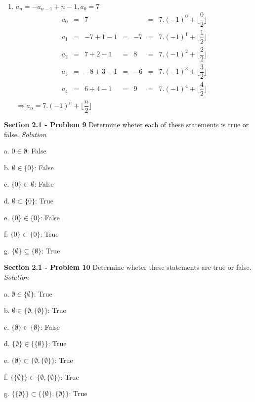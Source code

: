 \documentclass[10pt]{article}
\begin{document}
\begin{enumerate}
    \item $a_{n} = - a_{n - 1} + n - 1, a_{0} = 7$
        \begin{align*}
            a_{0} &=& 7 && &=& 7.(-1)^{0} + \lfloor \dfrac{0}{2} \rfloor \\
            a_{1} &=& -7 + 1 - 1 &=& -7 &=& 7.(-1)^{1} + \lfloor \dfrac{1}{2} \rfloor \\
            a_{2} &=& 7 + 2 - 1  &=& 8  &=& 7.(-1)^{2} + \lfloor \dfrac{2}{2} \rfloor \\
            a_{3} &=& -8 + 3 - 1 &=& -6 &=& 7.(-1)^{3} + \lfloor \dfrac{3}{2} \rfloor \\
            a_{4} &=& 6 + 4 - 1  &=& 9  &=& 7.(-1)^{4} + \lfloor \dfrac{4}{2} \rfloor \\
        \end{align*}
        $\Rightarrow a_{n} = 7.(-1)^{n} + \lfloor \dfrac{n}{2} \rfloor$

\end{enumerate}

\clearpage
\textbf{Section 2.1 - Problem 9} Determine wheter each of these statements is true or false.
\bigbreak
\textit{Solution} 
\bigbreak

    \par a. $0 \in \emptyset$: False
    \par b. $\emptyset \in \{0\}$: False
    \par c. $\{0\} \subset \emptyset$: False
    \par d. $\emptyset \subset \{0\}$: True
    \par e. $\{0\} \in \{0\}$: False
    \par f. $\{0\} \subset \{0\}$: True
    \par g. $\{\emptyset\} \subseteq \{\emptyset\}$: True

\clearpage
\textbf{Section 2.1 - Problem 10} Determine wheter these statements are true or false.
\bigbreak
\textit{Solution} 
\bigbreak

    \par a. $\emptyset \in \{\emptyset\}$: True
    \par b. $\emptyset \in \{\emptyset, \{\emptyset\}\}$: True
    \par c. $\{\emptyset\} \in \{\emptyset\}$: False
    \par d. $\{\emptyset\} \in \{\{\emptyset\}\}$: True
    \par e. $\{\emptyset\} \subset \{\emptyset, \{\emptyset\}\}$: True
    \par f. $\{\{\emptyset\}\} \subset \{\emptyset, \{\emptyset\}\}$: True
    \par g. $\{\{\emptyset\}\} \subset \{\{\emptyset\}, \{\emptyset\}\}$: True
\end{document}
